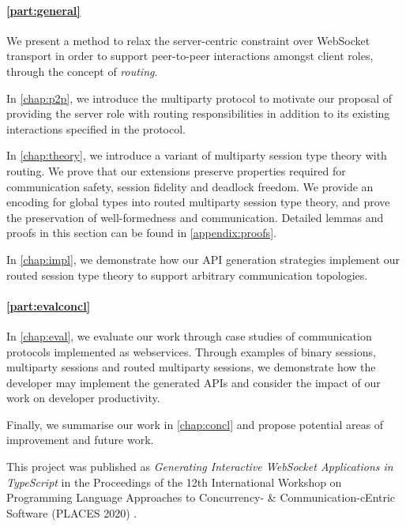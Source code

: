 \paragraph{\cref{part:general}} 
We present a method to relax the server-centric constraint over WebSocket
transport in order to support peer-to-peer interactions amongst 
client roles, through the concept of \emph{routing}.

In \cref{chap:p2p}, we introduce the  multiparty
protocol to motivate our proposal of providing the server role with 
routing responsibilities in addition to its existing interactions
specified in the protocol.

In \cref{chap:theory}, we introduce a variant of multiparty 
session type theory with routing. We prove that our extensions preserve 
properties required for communication safety, 
session fidelity and deadlock freedom.
We provide an encoding for global types into routed multiparty 
session type theory, and prove the preservation of well-formedness
and communication. Detailed lemmas and proofs in this section can
be found in \cref{appendix:proofs}.

In \cref{chap:impl}, we demonstrate how our API generation strategies
implement our routed session type theory to support arbitrary communication
topologies.

\paragraph{\cref{part:evalconcl}}
In \cref{chap:eval}, we evaluate our work through case studies of communication
protocols implemented as webservices. Through examples of binary sessions,
multiparty sessions and routed multiparty sessions, we demonstrate how the
developer may implement the generated APIs and consider the impact of our work
on developer productivity.

Finally, we summarise our work in \cref{chap:concl} and propose potential
areas of improvement and future work.

This project was published as \emph{Generating Interactive WebSocket 
Applications in TypeScript} in the Proceedings of the 
12th International Workshop on Programming Language Approaches to 
Concurrency- \& Communication-cEntric Software (PLACES 2020) 
\cite{PLACES2020}.